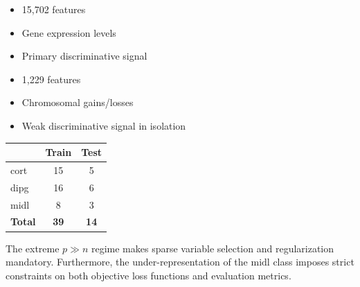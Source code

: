 \documentclass[a4paper,11pt]{paper}
\theoremstyle{plain}
\theoremstyle{definition}
\theoremstyle{remark}
\begin{document}
\begin{tcbitemize}[
        raster columns=2,
        raster equal height,
        raster column skip=1em,
        enhanced,
        boxrule=0.8pt,
        fonttitle=\bfseries\small,
        rounded corners,
        attach boxed title to top left,
        boxed title style={sharp corners, size=small}
    ]
    \tcbitem[
        title=GE Block (Gene Expression),
        colback=blue!5!white,
        colframe=blue!40!black,
        colbacktitle=blue!15!white,
        coltitle=blue!60!black
    ]
    \begin{itemize}
        \item 15,702 features
        \item Gene expression levels
        \item Primary discriminative signal
    \end{itemize}

    \tcbitem[
        title=CGH Block (Chromosomal Alterations),
        colback=orange!8!white,
        colframe=orange!50!black,
        colbacktitle=orange!15!white,
        coltitle=orange!70!black
    ]
    \begin{itemize}
        \item 1,229 features
        \item Chromosomal gains/losses
        \item Weak discriminative signal in isolation
    \end{itemize}
\end{tcbitemize}

\vspace{1em}
\begin{center}
    \begin{tabular}{lcc}
        \toprule
                       & \textbf{Train} & \textbf{Test} \\
        \midrule
        cort           & 15             & 5             \\
        dipg           & 16             & 6             \\
        midl           & 8              & 3             \\
        \midrule
        \textbf{Total} & \textbf{39}    & \textbf{14}   \\
        \bottomrule
    \end{tabular}
\end{center}

The extreme $p \gg n$ regime makes sparse variable selection and regularization mandatory. Furthermore, the under-representation of the $\text{midl}$ class imposes strict constraints on both objective loss functions and evaluation metrics.
\end{document}
